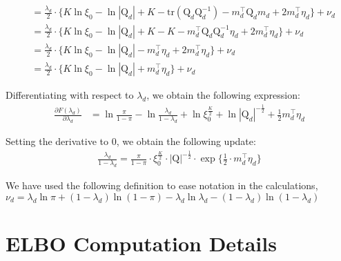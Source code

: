\documentclass[twoside,11pt]{article}
\newcommand{\transpose}[1]{#1^{\intercal}}
\newcommand{\qmat}{\mathrm{Q}}
\newcommand{\trace}[1]{\mathrm{tr} \left( #1 \right)}
\begin{document}
\begin{align*}
	&= \frac{\lambda_d}{2} \cdot \Bigg\{ K \ln \xi_0 - \ln |\qmat_d | + K -  \trace{\qmat_d \qmat_d^{-1}} - \transpose{m_d} \qmat_d m_d + 2\transpose{m_d}\eta_d \Bigg\} + \nu_d\\ 
	&= \frac{\lambda_d}{2} \cdot \Bigg\{ K \ln \xi_0 - \ln |\qmat_d | + K - K - \transpose{m_d} \qmat_d \qmat_d^{-1} \eta_d + 2\transpose{m_d}\eta_d \Bigg\} + \nu_d\\ 
	&= \frac{\lambda_d}{2} \cdot \Bigg\{ K \ln \xi_0 - \ln |\qmat_d | - \transpose{m_d} \eta_d + 2\transpose{m_d}\eta_d \Bigg\} + \nu_d\\ 
	&= \frac{\lambda_d}{2} \cdot \Bigg\{ K \ln \xi_0 - \ln |\qmat_d | + \transpose{m_d} \eta_d \Bigg\} + \nu_d
\end{align*}

Differentiating with respect to $\lambda_d$, we obtain the following expression:
\begin{align*}
	\frac{\partial F(\lambda_d)}{\partial \lambda_d} &= \ln \frac{\pi}{1-\pi} - \ln \frac{\lambda_d}{1-\lambda_d} + \ln \xi_0^{\frac{K}{2}} + \ln |\qmat_d|^{- \frac{1}{2}} + \frac{1}{2} \transpose{m_d} \eta_d
\end{align*}

Setting the derivative to 0, we obtain the following update:
\begin{align*}
	\frac{\lambda_d}{1- \lambda_d} = \frac{\pi}{1-\pi} \cdot \xi_0^{\frac{K}{2}} \cdot |\qmat|^{-\frac{1}{2}} \cdot \exp \Big\{ \frac{1}{2} \cdot \transpose{m_d} \eta_d\Big\}
\end{align*}

We have used the following definition to ease notation in the calculations, $\nu_d = \lambda_d \ln \pi + (1 - \lambda_d) \ln(1-\pi) - \lambda_d \ln \lambda_d - (1 - \lambda_d) \ln (1 - \lambda_d)$

\newpage

\section{ELBO Computation Details}

\end{document}
